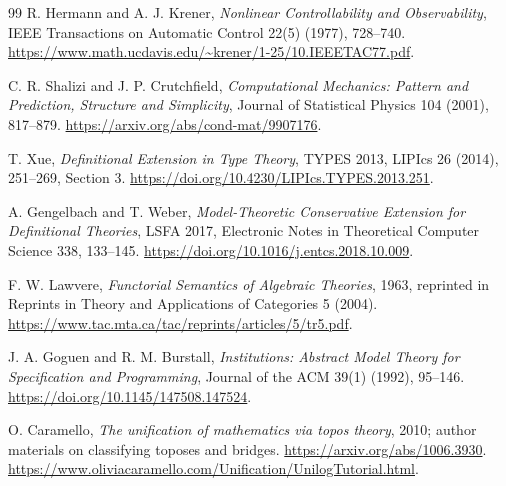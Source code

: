 \documentclass[11pt]{article}
\theoremstyle{definition}
\begin{document}
\begin{thebibliography}{99}
R. Hermann and A. J. Krener,
\emph{Nonlinear Controllability and Observability},
IEEE Transactions on Automatic Control 22(5) (1977), 728--740.
\url{https://www.math.ucdavis.edu/~krener/1-25/10.IEEETAC77.pdf}.

C. R. Shalizi and J. P. Crutchfield,
\emph{Computational Mechanics: Pattern and Prediction, Structure and
Simplicity}, Journal of Statistical Physics 104 (2001), 817--879.
\url{https://arxiv.org/abs/cond-mat/9907176}.

T. Xue, \emph{Definitional Extension in Type Theory},
TYPES 2013, LIPIcs 26 (2014), 251--269, Section 3.
\url{https://doi.org/10.4230/LIPIcs.TYPES.2013.251}.

A. Gengelbach and T. Weber,
\emph{Model-Theoretic Conservative Extension for Definitional Theories},
LSFA 2017, Electronic Notes in Theoretical Computer Science 338, 133--145.
\url{https://doi.org/10.1016/j.entcs.2018.10.009}.

F. W. Lawvere, \emph{Functorial Semantics of Algebraic Theories},
1963, reprinted in Reprints in Theory and Applications of Categories 5 (2004).
\url{https://www.tac.mta.ca/tac/reprints/articles/5/tr5.pdf}.

J. A. Goguen and R. M. Burstall,
\emph{Institutions: Abstract Model Theory for Specification and Programming},
Journal of the ACM 39(1) (1992), 95--146.
\url{https://doi.org/10.1145/147508.147524}.

O. Caramello, \emph{The unification of mathematics via topos theory},
2010; author materials on classifying toposes and bridges.
\url{https://arxiv.org/abs/1006.3930}.
\url{https://www.oliviacaramello.com/Unification/UnilogTutorial.html}.
\end{thebibliography}
\end{document}
